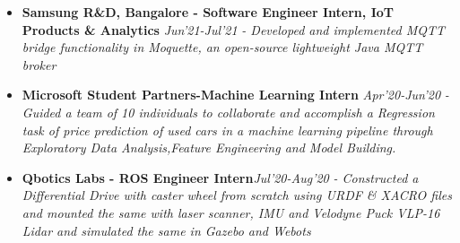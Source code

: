 \documentclass{article}
\begin{document}
\begin{itemize}
    \item{\textbf{\large{Samsung R\&D, Bangalore - Software Engineer Intern, IoT Products \& Analytics}}} \hfill \textit{Jun'21-Jul'21}
          \newline
          \textit{- Developed and implemented MQTT bridge functionality in Moquette, an open-source lightweight Java MQTT broker}
\end{itemize}


\begin{itemize}
    \item{\textbf{\large{Microsoft Student Partners-Machine Learning Intern}}} \hfill \textit{Apr'20-Jun'20}
          \newline
          \textit{-Guided a team of 10 individuals to collaborate and accomplish a Regression task of price prediction of used cars in a machine learning pipeline through Exploratory Data Analysis,Feature Engineering and Model Building.}

\end{itemize}


\begin{itemize}
    \item{\textbf{\large{Qbotics Labs - ROS Engineer Intern}}}\hfill \textit{Jul'20-Aug'20}
          \newline
          \textit{- Constructed a Differential Drive with caster wheel from scratch using URDF \& XACRO files and mounted the same with laser scanner, IMU and Velodyne Puck VLP-16 Lidar and simulated the same in Gazebo and Webots}
\end{itemize}

\end{document}
